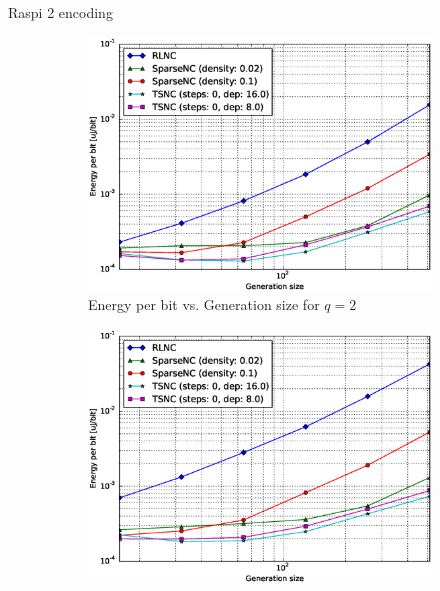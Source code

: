 Raspi 2 encoding

\begin{figure}
    \centering
    \begin{subfigure}[b]{0.475\textwidth}
        \centering
        \includegraphics[width=1.1\textwidth]{images/23_07_2015/energy_per_bit_vs_generation_size_Rasp_v2_Binary_encoder_1600.eps}
        \caption[]%
        {{\small Energy per bit vs. Generation size for $q = 2$}}
        \label{fig:enc_ene_rasp2_gen_gf2}
    \end{subfigure}
    \hfill
    \begin{subfigure}[b]{0.475\textwidth}
        \centering
        \includegraphics[width=1.1\textwidth]{images/23_07_2015/energy_per_bit_vs_generation_size_Rasp_v2_Binary8_encoder_1600.eps}

\end{subfigure}
\end{figure}
